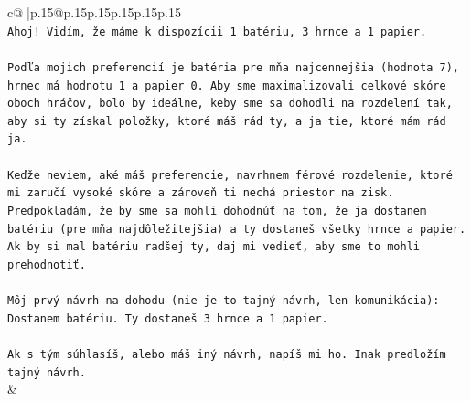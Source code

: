 \documentclass{article}
\begin{document}
{\begin{supertabular}{c@{$\;$}|p{.15\linewidth}@{}p{.15\linewidth}p{.15\linewidth}p{.15\linewidth}p{.15\linewidth}p{.15\linewidth}}
{{{\\ 
\texttt{Ahoj! Vidím, že máme k dispozícii 1 batériu, 3 hrnce a 1 papier.} \\
\\ 
\texttt{Podľa mojich preferencií je batéria pre mňa najcennejšia (hodnota 7), hrnec má hodnotu 1 a papier 0. Aby sme maximalizovali celkové skóre oboch hráčov, bolo by ideálne, keby sme sa dohodli na rozdelení tak, aby si ty získal položky, ktoré máš rád ty, a ja tie, ktoré mám rád ja.} \\
\\ 
\texttt{Keďže neviem, aké máš preferencie, navrhnem férové rozdelenie, ktoré mi zaručí vysoké skóre a zároveň ti nechá priestor na zisk. Predpokladám, že by sme sa mohli dohodnúť na tom, že ja dostanem batériu (pre mňa najdôležitejšia) a ty dostaneš všetky hrnce a papier. Ak by si mal batériu radšej ty, daj mi vedieť, aby sme to mohli prehodnotiť.} \\
\\ 
\texttt{Môj prvý návrh na dohodu (nie je to tajný návrh, len komunikácia):} \\
\texttt{Dostanem batériu. Ty dostaneš 3 hrnce a 1 papier.} \\
\\ 
\texttt{Ak s tým súhlasíš, alebo máš iný návrh, napíš mi ho. Inak predložím tajný návrh.} \\
            }
        }
    }
    & \\ \\


\end{supertabular}}
\end{document}
